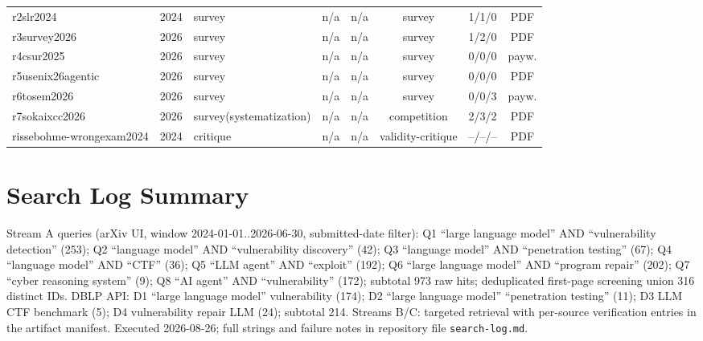 \documentclass[conference,compsoc]{IEEEtran}
\begin{document}
\begin{table}[t]
{\begin{tabular}{lllllccc}
r2slr2024 & 2024 & survey & n/a & n/a & survey & 1/1/0 & PDF\\
r3survey2026 & 2026 & survey & n/a & n/a & survey & 1/2/0 & PDF\\
r4csur2025 & 2026 & survey & n/a & n/a & survey & 0/0/0 & payw.\\
r5usenix26agentic & 2026 & survey & n/a & n/a & survey & 0/0/0 & PDF\\
r6tosem2026 & 2026 & survey & n/a & n/a & survey & 0/0/3 & payw.\\
r7sokaixcc2026 & 2026 & survey(systematization) & n/a & n/a & competition & 2/3/2 & PDF\\
rissebohme-wrongexam2024 & 2024 & critique & n/a & n/a & validity-critique & --/--/-- & PDF\\
\bottomrule
\end{tabular}}
\end{table}
\section{Search Log Summary}
\label{app:search}
Stream A queries (arXiv UI, window 2024-01-01..2026-06-30, submitted-date filter):
Q1 ``large language model'' AND ``vulnerability detection'' (253); Q2 ``language model'' AND
``vulnerability discovery'' (42); Q3 ``language model'' AND ``penetration testing'' (67);
Q4 ``language model'' AND ``CTF'' (36); Q5 ``LLM agent'' AND ``exploit'' (192);
Q6 ``large language model'' AND ``program repair'' (202); Q7 ``cyber reasoning system'' (9);
Q8 ``AI agent'' AND ``vulnerability'' (172); subtotal 973 raw hits; deduplicated first-page
screening union 316 distinct IDs. DBLP API: D1 ``large language model'' vulnerability (174);
D2 ``large language model'' ``penetration testing'' (11); D3 LLM CTF benchmark (5);
D4 vulnerability repair LLM (24); subtotal 214. Streams B/C: targeted retrieval with per-source
verification entries in the artifact manifest. Executed 2026-08-26; full strings and failure
notes in repository file \texttt{search-log.md}.

\end{document}
